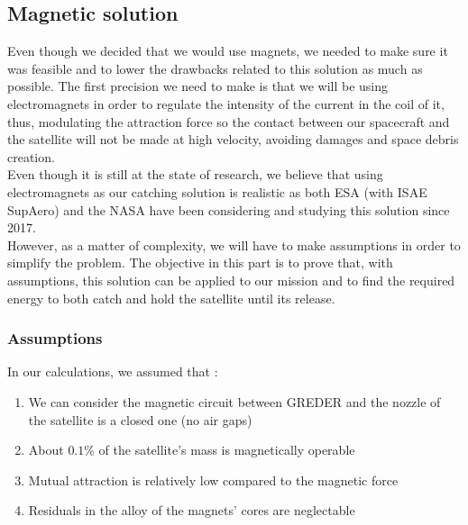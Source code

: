 \subsection{Magnetic solution}
\qquad Even though we decided that we would use magnets, we needed to make sure it was feasible and to lower the drawbacks related to this solution as much as possible. The first precision we need to make is that we will be using electromagnets in order to regulate the intensity of the current in the coil of it, thus, modulating the attraction force so the contact between our spacecraft and the satellite will not be made at high velocity, avoiding damages and space debris creation. \\

Even though it is still at the state of research, we believe that using electromagnets as our catching solution is realistic as both ESA (with ISAE SupAero) and the NASA have been considering and studying this solution since 2017.\\

However, as a matter of complexity, we will have to make assumptions in order to simplify the problem. The objective in this part is to prove that, with assumptions, this solution can be applied to our mission and to find the required energy to both catch and hold the satellite until its release.
\subsubsection{Assumptions}
In our calculations, we assumed that :
\begin{enumerate}
	\item We can consider the magnetic circuit between GREDER and the nozzle of the satellite is a closed one (no air gaps)
	\item About $0.1$\% of the satellite's mass is magnetically operable
	\item Mutual attraction is relatively low compared to the magnetic force
	\item Residuals in the alloy of the magnets' cores are neglectable
\end{enumerate}
